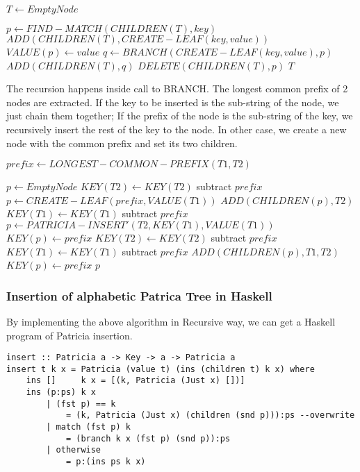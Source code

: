 \documentclass{article}
\begin{document}
\begin{algorithmic}[1]
   \State $T \leftarrow EmptyNode$ \EndIf

\State $p \leftarrow FIND-MATCH(CHILDREN(T), key)$
  \State $ADD(CHILDREN(T), CREATE-LEAF(key, value))$
  \State $VALUE(p) \leftarrow value$
\Else
  \State $q \leftarrow BRANCH(CREATE-LEAF(key, value), p)$
  \State $ADD(CHILDREN(T), q)$
  \State $DELETE(CHILDREN(T), p)$
\EndIf
\State \Return $T$
\EndFunction
\end{algorithmic}

The recursion happens inside call to BRANCH. The longest common prefix
of 2 nodes are extracted. If the key to be inserted is the sub-string of
the node, we just chain them together; If the prefix of the node is
the sub-string of the key, we recursively insert the rest of the key
to the node. In other case, we create a new node with the common
prefix and set its two children.

\begin{algorithmic}[1]
  \State $prefix \leftarrow LONGEST-COMMON-PREFIX(T1, T2)$

  \State $p \leftarrow EmptyNode$
    \State $KEY(T2) \leftarrow KEY(T2)$ subtract $prefix$
    \State $p \leftarrow CREATE-LEAF(prefix, VALUE(T1))$
    \State $ADD(CHILDREN(p), T2)$
    \State $KEY(T1) \leftarrow KEY(T1)$ subtract $prefix$
    \State $p \leftarrow PATRICIA-INSERT'(T2, KEY(T1), VALUE(T1))$
    \State $KEY(p) \leftarrow prefix$
  \Else
    \State $KEY(T2) \leftarrow KEY(T2)$ subtract $prefix$
    \State $KEY(T1) \leftarrow KEY(T1)$ subtract $prefix$
    \State $ADD(CHILDREN(p), T1, T2)$
    \State $KEY(p) \leftarrow prefix$
  \EndIf
  \State \Return $p$
\EndFunction
\end{algorithmic}

\subsubsection*{Insertion of alphabetic Patrica Tree in Haskell}
By implementing the above algorithm in Recursive way, we can get a
Haskell program of Patricia insertion.

\lstset{language=Haskell}
\begin{lstlisting}
insert :: Patricia a -> Key -> a -> Patricia a
insert t k x = Patricia (value t) (ins (children t) k x) where
    ins []     k x = [(k, Patricia (Just x) [])]
    ins (p:ps) k x
        | (fst p) == k
            = (k, Patricia (Just x) (children (snd p))):ps --overwrite
        | match (fst p) k
            = (branch k x (fst p) (snd p)):ps
        | otherwise
            = p:(ins ps k x)

\end{lstlisting}
\end{document}
